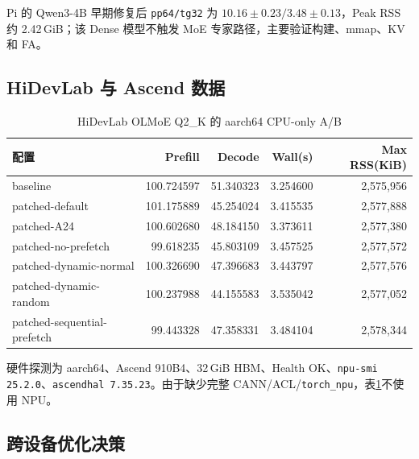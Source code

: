 Pi 的 Qwen3-4B 早期修复后 \texttt{pp64/tg32} 为 $10.16\pm0.23/3.48\pm0.13$，Peak RSS 约 2.42\,GiB；该 Dense 模型不触发 MoE 专家路径，主要验证构建、mmap、KV 和 FA。

\subsection{HiDevLab 与 Ascend 数据}

\begin{table}[H]
  \centering
  \scriptsize
  \caption{HiDevLab OLMoE Q2\_K 的 aarch64 CPU-only A/B}
  \label{tab:appendix-ascend-all}
  \begin{tabular}{lrrrr}
    \toprule
    配置 & Prefill & Decode & Wall(s) & Max RSS(KiB) \\
    \midrule
    baseline & 100.724597 & 51.340323 & 3.254600 & 2,575,956 \\
    patched-default & 101.175889 & 45.254024 & 3.415535 & 2,577,888 \\
    patched-A24 & 100.602680 & 48.184150 & 3.373611 & 2,577,380 \\
    patched-no-prefetch & 99.618235 & 45.803109 & 3.457525 & 2,577,572 \\
    patched-dynamic-normal & 100.326690 & 47.396683 & 3.443797 & 2,577,576 \\
    patched-dynamic-random & 100.237988 & 44.155583 & 3.535042 & 2,577,052 \\
    patched-sequential-prefetch & 99.443328 & 47.358331 & 3.484104 & 2,578,344 \\
    \bottomrule
  \end{tabular}
\end{table}

硬件探测为 aarch64、Ascend 910B4、32\,GiB HBM、Health OK、\texttt{npu-smi 25.2.0}、\texttt{ascendhal 7.35.23}。由于缺少完整 CANN/ACL/\texttt{torch\_npu}，表\ref{tab:appendix-ascend-all}不使用 NPU。

\subsection{跨设备优化决策}

